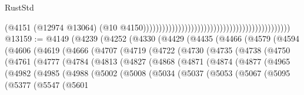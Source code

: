 \begin{lexlean}{RustStd}
\begin{coremodule}
                                                                                            (@4151
                                                                                              (@12974
                                                                                                @13064)
                                                                                              (@10
                                                                                                @4150))))))))))))))))))))))))))))))))))))))))))))))
@13159 := @4149
    (@4239
      (@4252
        (@4330
          (@4429
            (@4435
              (@4466
                (@4579
                  (@4594
                    (@4606
                      (@4619
                        (@4666
                          (@4707
                            (@4719
                              (@4722
                                (@4730
                                  (@4735
                                    (@4738
                                      (@4750
                                        (@4761
                                          (@4777
                                            (@4784
                                              (@4813
                                                (@4827
                                                  (@4868
                                                    (@4871
                                                      (@4874
                                                        (@4877
                                                          (@4965
                                                            (@4982
                                                              (@4985
                                                                (@4988
                                                                  (@5002
                                                                    (@5008
                                                                      (@5034
                                                                        (@5037
                                                                          (@5053
                                                                            (@5067
                                                                              (@5095
                                                                                (@5377
                                                                                  (@5547
                                                                                    (@5601

\end{coremodule}
\end{lexlean}
